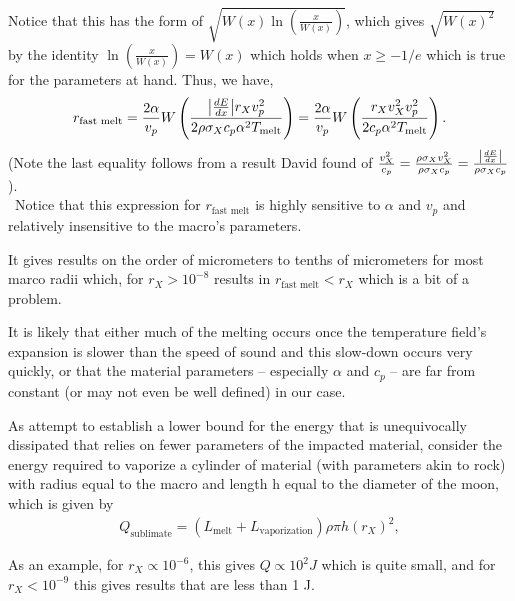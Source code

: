\documentclass{article}
\newcommand*\te[1]{\text{#1}}
\newcommand*\p[1]{\left(#1\right)}
\newcommand*\f[2]{\frac{#1}{#2}}
\begin{document}
Notice that this has the form of $\sqrt{W(x)\ln\p{{\frac{x}{W(x)}}}}$, which gives $\sqrt{W(x)^2}$ by the identity $\ln\p{{\frac{x}{W(x)}}} = W(x)$ which holds when $x \geq -1/e$ which is true for the parameters at hand.  Thus, we have,
\begin{align}
r_\te{fast melt} =\frac{2\alpha}{v_p}W\p{{\f{\abs{\frac{dE}{dx}}r_{X}v_p^2}{2 \rho \sigma_X c_p \alpha^2 T_\te{melt}}}} = \frac{2\alpha}{v_p}W\p{\frac{r_{X}v_{X}^2 v_p^2}{2 c_p \alpha^2 T_\te{melt}}}.
\end{align}
(Note the last equality follows from a result David found of $\frac{v_{X}^2}{c_p} =  \frac{\rho \sigma_X v_X^2}{\rho \sigma_X c_p} = \frac{\abs{\frac{dE}{dx}}}{\rho \sigma_X c_p}$).
\\\
Notice that this expression for $r_\te{fast melt}$ is highly sensitive to $\alpha$ and $v_p$ and relatively insensitive to the macro's parameters.

It gives results on the order of micrometers to tenths of micrometers for most marco radii which, for $r_X > 10^{-8}$ results in $r_\te{fast melt} < r_X$ which is a bit of a problem.

It is likely that either much of the melting occurs once the temperature field's expansion is slower than the speed of sound and this slow-down occurs very quickly, or that the material parameters -- especially $\alpha$ and $c_p$ -- are far from constant (or may not even be well defined) in our case.

As attempt to establish a lower bound for the energy that is unequivocally dissipated that relies on fewer parameters of the impacted material, consider the energy required to vaporize a cylinder of material (with parameters akin to rock) with radius equal to the macro and length h equal to the diameter of the moon, which is given by
\begin{align}
Q_\te{sublimate} = (L_\te{melt} + L_\te{vaporization})\rho \pi h(r_X)^2,
\end{align}

As an example, for $r_X \propto 10^{-6}$, this gives $Q \propto 10^2 J$ which is quite small, and for $r_X < 10^{-9}$ this gives results that are less than 1 J.
\end{document}
